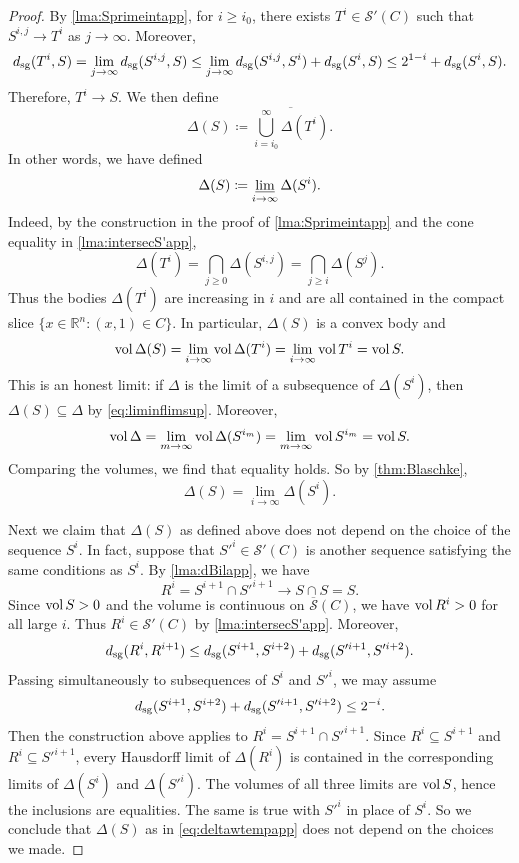 \begin{proof}
    By \cref{lma:Sprimeintapp}, for $i\geq i_0$, there exists $T^i\in \mathcal{S}'(C)$ such that $S^{i,j}\to T^i$ as $j\to\infty$. Moreover,
    \[
    d_{\mathrm{sg}}(T^i,S)=\lim_{j\to\infty} d_{\mathrm{sg}}(S^{i,j},S)\leq \lim_{j\to\infty} d_{\mathrm{sg}}(S^{i,j},S^i)+d_{\mathrm{sg}}(S^i,S)\leq 2^{1-i}+d_{\mathrm{sg}}(S^i,S).
    \]
    Therefore, $T^i\to S$. We then define
    \[
    \Delta(S)\coloneqq \overline{\bigcup_{i=i_0}^{\infty} \Delta(T^i)}.
    \]
    In other words, we have defined
    \[
	\Delta(S)\coloneqq \varliminf_{i\to\infty}\Delta(S^i).
    \]
    Indeed, by the construction in the proof of \cref{lma:Sprimeintapp} and the cone equality in \cref{lma:intersecS'app},
    \[
    \Delta(T^i)=\bigcap_{j\geq 0}\Delta(S^{i,j})
    =\bigcap_{j\geq i}\Delta(S^j).
    \]
    Thus the bodies $\Delta(T^i)$ are increasing in $i$ and are all contained in the compact slice $\{x\in \mathbb{R}^n:(x,1)\in C\}$. In particular, $\Delta(S)$ is a convex body and
    \[
    \operatorname{vol}\Delta(S)=\lim_{i\to\infty}\operatorname{vol}\Delta(T^i)=\lim_{i\to\infty}\operatorname{vol} T^i=\operatorname{vol} S.
    \]
    This is an honest limit: if $\Delta$ is the limit of a subsequence of $\Delta(S^i)$, then $\Delta(S)\subseteq \Delta$ by \eqref{eq:liminflimsup}. Moreover,
    \[
    \operatorname{vol}\Delta=\lim_{m\to\infty}\operatorname{vol}\Delta(S^{i_m})=\lim_{m\to\infty}\operatorname{vol} S^{i_m}=\operatorname{vol} S.
    \]
    Comparing the volumes, we find that equality holds. So by \cref{thm:Blaschke},
    \begin{equation}\label{eq:deltawtempapp}
	\Delta(S)=\lim_{i\to\infty}\Delta(S^i).
    \end{equation}

    Next we claim that $\Delta(S)$ as defined above does not depend on the choice of the sequence $S^i$. In fact, suppose that $S'^i\in \mathcal{S}'(C)$ is another sequence satisfying the same conditions as $S^i$.
    By \cref{lma:dBilapp}, we have
    \[
        R^i=S^{i+1}\cap S'^{i+1}\longrightarrow S\cap S=S.
    \]
    Since $\operatorname{vol} S>0$ and the volume is continuous on $\overline{\mathcal S}(C)$, we have $\operatorname{vol} R^i>0$ for all large $i$. Thus $R^i\in\mathcal S'(C)$ by \cref{lma:intersecS'app}. Moreover,
    \[
        d_{\mathrm{sg}}(R^i,R^{i+1}) \leq d_{\mathrm{sg}}(S^{i+1},S^{i+2}) + d_{\mathrm{sg}}(S'^{i+1},S'^{i+2}).
    \]
    Passing simultaneously to subsequences of $S^i$ and $S'^i$, we may assume
    \[
        d_{\mathrm{sg}}(S^{i+1},S^{i+2})+d_{\mathrm{sg}}(S'^{i+1},S'^{i+2})\leq 2^{-i}.
    \]
    Then the construction above applies to $R^i=S^{i+1}\cap S'^{i+1}$. Since $R^i\subseteq S^{i+1}$ and $R^i\subseteq S'^{i+1}$, every Hausdorff limit of $\Delta(R^i)$ is contained in the corresponding limits of $\Delta(S^i)$ and $\Delta(S'^i)$. The volumes of all three limits are $\operatorname{vol} S$, hence the inclusions are equalities. The same is true with $S'^i$ in place of $S^i$. So we conclude that $\Delta(S)$ as in \eqref{eq:deltawtempapp} does not depend on the choices we made.


\end{proof}
